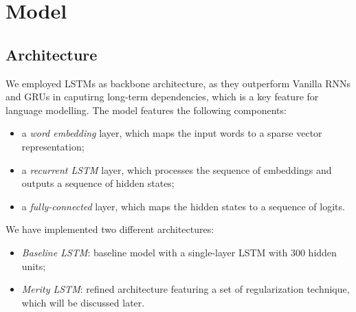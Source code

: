 \section{Model}
\label{sec:4_model}
 
\subsection{Architecture}
\label{sec:4_arch}
We employed LSTMs\cite{hochreiter1997lstm} as backbone architecture, as they outperform Vanilla RNNs and GRUs in caputirng long-term dependencies, which is a key feature for language modelling. The model features the following components:
\begin{itemize}
    \item a \emph{word embedding} layer, which maps the input words to a sparse vector representation;
    \item a \emph{recurrent LSTM} layer, which processes the sequence of embeddings and outputs a sequence of hidden states;
    \item a \emph{fully-connected} layer, which maps the hidden states to a sequence of logits.
\end{itemize}
We have implemented two different architectures:
\begin{itemize}
    \item \emph{Baseline LSTM}: baseline model with a single-layer LSTM with \(300\) hidden units;
    \item \emph{Merity LSTM}: refined architecture featuring a set of regularization technique, which will be discussed later.
\end{itemize}

